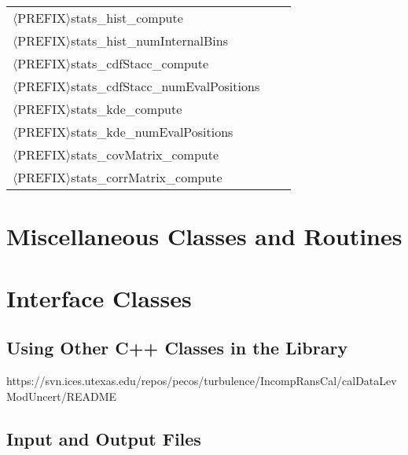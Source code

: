 \begin{table}[htpb]
\begin{center}
\begin{tabular}{l|c|c}
\hline
$\langle$PREFIX$\rangle$stats\_hist\_compute              &         &             \\
$\langle$PREFIX$\rangle$stats\_hist\_numInternalBins      &         &             \\
\hline
$\langle$PREFIX$\rangle$stats\_cdfStacc\_compute          &         &             \\
$\langle$PREFIX$\rangle$stats\_cdfStacc\_numEvalPositions &         &             \\
\hline
$\langle$PREFIX$\rangle$stats\_kde\_compute               &         &             \\
$\langle$PREFIX$\rangle$stats\_kde\_numEvalPositions      &         &             \\
\hline
$\langle$PREFIX$\rangle$stats\_covMatrix\_compute         &         &             \\
$\langle$PREFIX$\rangle$stats\_corrMatrix\_compute        &         &             \\
\bottomrule
\end{tabular}
\end{center}
\label{tab-seq-statistical-options}
\end{table}


\section{Miscellaneous Classes and Routines}

\section{Interface Classes}



\subsection{Using Other C++ Classes in the Library}

https://svn.ices.utexas.edu/repos/pecos/turbulence/IncompRansCal/calDataLevModUncert/README


\subsection{Input and Output Files}


